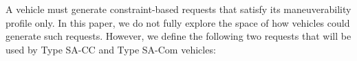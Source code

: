 





\noindent
A vehicle must generate constraint-based requests that satisfy
its maneuverability profile only.  In this paper, we do not fully explore
the space of how vehicles could generate such requests.  However, we
define the following two requests that will be used by Type SA-CC and
Type SA-Com vehicles:

